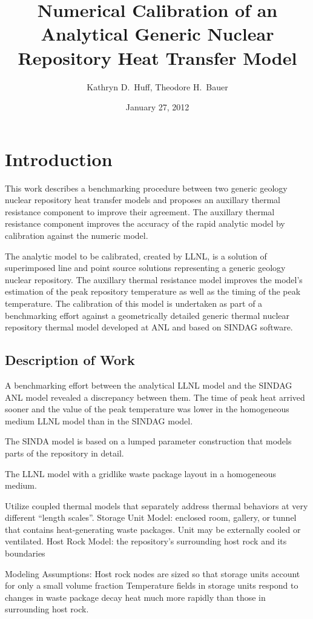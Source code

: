 \documentclass{anstrans}
\title{Numerical Calibration of an Analytical Generic Nuclear Repository Heat 
Transfer Model}
\author{Kathryn D.~Huff, Theodore H.~Bauer}
\institute{Department of Nuclear Engineering \& Engineering Physics, University 
of Wisconsin, Madison, WI, 53706\\
Nuclear Engineering Division, Argonne National Laboratory, Argonne, IL, 60439}
\date{January 27, 2012}
\begin{document}
\section{Introduction}

This work describes a benchmarking procedure between two generic geology nuclear 
repository heat transfer models and proposes an auxillary thermal resistance 
component to improve their agreement. The auxillary thermal resistance 
component improves the accuracy of the rapid analytic model by calibration against
the numeric model. 

The analytic model to be calibrated, created by \gls{LLNL}, is a solution of
superimposed line and point source solutions representing a generic geology 
nuclear repository. The auxillary thermal resistance model improves the model's 
estimation of the peak repository temperature as well as the timing of the peak 
temperature. The calibration of this model is undertaken as part 
of a benchmarking effort against a geometrically detailed generic thermal 
nuclear repository thermal model developed at \gls{ANL} and based on 
\gls{SINDAG} software.

\subsection{Description of Work}

A benchmarking effort between the analytical \gls{LLNL} model and the 
\gls{SINDAG} \gls{ANL} model revealed a discrepancy between them. The time of 
peak heat arrived sooner and the value of the peak temperature was lower in the 
homogeneous medium \gls{LLNL} model than in the \gls{SINDAG} model. 

The SINDA model is based on a lumped parameter construction that models parts of 
the repository in detail. 

The LLNL model
with a gridlike waste package layout in a homogeneous medium. 

Utilize coupled thermal models that separately address thermal behaviors at very 
different “length scales”.
Storage Unit Model: enclosed room, gallery, or tunnel that contains 
heat-generating waste packages.  Unit may be externally cooled or ventilated.
Host Rock Model: the repository’s surrounding host rock and its boundaries

Modeling Assumptions:
Host rock nodes are sized so that storage units account for only a small volume 
fraction
Temperature fields in storage units respond to changes in waste package decay 
heat much more rapidly than those in surrounding host rock. 
\end{document}
